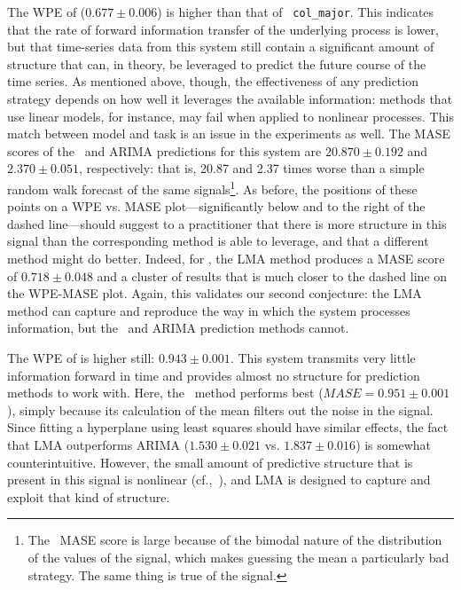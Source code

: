 The WPE of \svdfive ($0.677 \pm 0.006$) is higher than that of {\tt
  col\_major}.  This indicates that the rate of forward information
transfer of the underlying process is lower, but that time-series data
from this system still contain a significant amount of structure that
can, in theory, be leveraged to predict the future course of the time
series.  As mentioned above, though, the effectiveness of any
prediction strategy depends on how well it leverages the available
information: methods that use linear models, for instance, may fail
when applied to nonlinear processes.
% 
% 
This match between model and task is an issue in the \svdfive
experiments as well.  The MASE scores of the \naive ~and ARIMA
predictions for this system are $20.870 \pm 0.192$ and $2.370 \pm
0.051$, respectively: that is, 20.87 and 2.37 times worse than a
simple random walk forecast of the same signals\footnote{The \naive
  ~MASE score is large because of the bimodal nature of the
  distribution of the values of the signal, which makes guessing the
  mean a particularly bad strategy.  The same thing is true of the
  \svdthree signal.}.  As before, the positions of these points on a
WPE vs. MASE plot---significantly below and to the right of the
dashed line---should suggest to a practitioner that there is more
structure in this signal than the corresponding method is able to
leverage, and that a different method might do better.  Indeed, for
\svdfive, the LMA method produces a MASE score of $ 0.718\pm 0.048 $
and a cluster of results that is much closer to the dashed line on the
WPE-MASE plot.  Again, this validates our second conjecture: the LMA
method can capture and reproduce the way in which the \svdfive system
processes information, but the \naive ~and ARIMA prediction methods
cannot.

The WPE of \gcc is higher still: $0.943 \pm 0.001$.  This system
transmits very little information forward in time and provides almost
no structure for prediction methods to work with.  Here, the \naive
~method performs best ($MASE=0.951 \pm 0.001$), simply because its
calculation of the mean filters out the noise in the signal.  Since
fitting a hyperplane using least squares should have similar effects,
the fact that LMA outperforms ARIMA ($1.530 \pm 0.021$ vs. $1.837 \pm
0.016$) is somewhat counterintuitive.  However, the small amount of
predictive structure that is present in this signal is nonlinear
(cf.,~\cite{mytkowicz09}), and LMA is designed to capture and exploit
that kind of structure.

